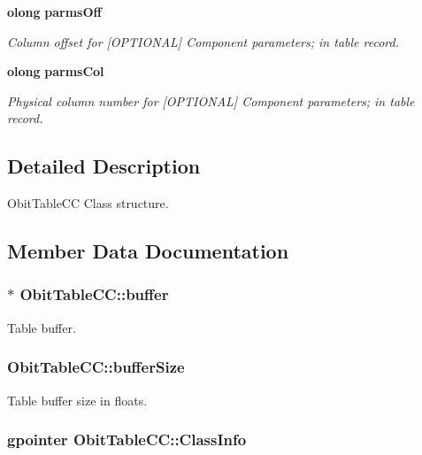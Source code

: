 \begin{CompactItemize}
{\bf olong} {\bf parms\-Off}
\begin{CompactList}\small\item\em Column offset for [OPTIONAL] Component parameters; in table record. \item\end{CompactList}\item 
{\bf olong} {\bf parms\-Col}
\begin{CompactList}\small\item\em Physical column number for [OPTIONAL] Component parameters; in table record. \item\end{CompactList}\end{CompactItemize}


\subsection{Detailed Description}
Obit\-Table\-CC Class structure. 



\subsection{Member Data Documentation}
\subsubsection{$\ast$ {\bf Obit\-Table\-CC::buffer}}\label{structObitTableCC_o10}


Table buffer. 

\subsubsection{ {\bf Obit\-Table\-CC::buffer\-Size}}\label{structObitTableCC_o11}


Table buffer size in floats. 

\subsubsection{\setlength{\rightskip}{0pt plus 5cm}gpointer {\bf Obit\-Table\-CC::Class\-Info}}\label{structObitTableCC_o1}


